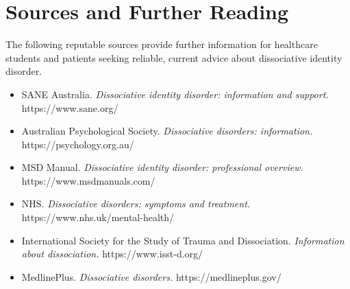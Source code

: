 \section*{Sources and Further Reading}
The following reputable sources provide further information for healthcare students and patients seeking reliable, current advice about dissociative identity disorder.

\begin{itemize}
    \item SANE Australia. \textit{Dissociative identity disorder: information and support.} https://www.sane.org/
    \item Australian Psychological Society. \textit{Dissociative disorders: information.} https://psychology.org.au/
    \item MSD Manual. \textit{Dissociative identity disorder: professional overview.} https://www.msdmanuals.com/
    \item NHS. \textit{Dissociative disorders: symptoms and treatment.} https://www.nhs.uk/mental-health/
    \item International Society for the Study of Trauma and Dissociation. \textit{Information about dissociation.} https://www.isst-d.org/
    \item MedlinePlus. \textit{Dissociative disorders.} https://medlineplus.gov/
\end{itemize}
